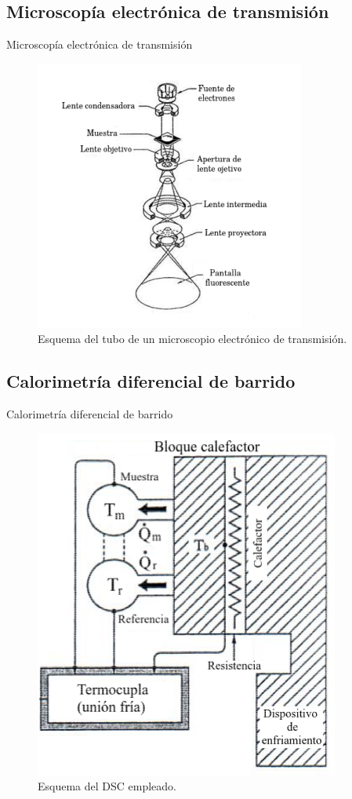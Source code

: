\documentclass[11pt]{beamer}
\begin{document}
	\subsection{Microscopía electrónica de transmisión}
		\begin{frame}{Microscopía electrónica de transmisión}
			\begin{figure}[H]
				\centering
				\includegraphics[scale=0.4]{img/TEM.png}
				\caption*{Esquema del tubo de un microscopio electrónico de 							  transmisión.}
			\end{figure}
		\end{frame}

	\subsection{Calorimetría diferencial de barrido}
		\begin{frame}{Calorimetría diferencial de barrido}
			\begin{figure}[H]
				\centering
				\includegraphics[scale=0.3]{img/DSCscheme.png}
				\caption*{Esquema del DSC empleado.}
			\end{figure}
		\end{frame}
\end{document}

